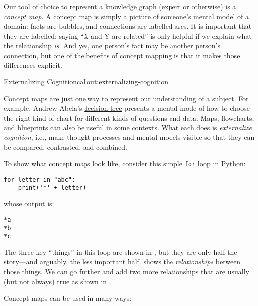 
Our tool of choice to represent a knowledge graph (expert or
otherwise) is a \emph{concept map}.  A concept map is simply a picture
of someone's mental model of a domain: facts are bubbles, and
connections are labelled arcs. It is important that they are labelled:
saying ``X and Y are related'' is only helpful if we explain what the
relationship \emph{is}. And yes, one person's fact may be another
person's connection, but one of the benefits of concept mapping is
that it makes those differences explicit.

\begin{callout}{Externalizing Cognition}{callout:externalizing-cognition}

Concept maps are just one way to represent our understanding of a
subject.  For example, Andrew Abela's
\href{http://extremepresentation.typepad.com/files/choosing-a-good-chart-09.pdf}{decision tree}
presents a mental mode of how to choose the right kind of chart for
different kinds of questions and data.  Maps, flowcharts, and
blueprints can also be useful in some contexts.  What each does
is \emph{externalize cognition}, i.e., make thought processes and
mental models visible so that they can be compared, contrasted, and
combined.

\end{callout}

To show what concept maps look like, consider this simple \texttt{for}
loop in Python:

\begin{verbatim}
for letter in "abc":
    print('*' + letter)
\end{verbatim}

\noindent
whose output is:

\begin{verbatim}
*a
*b
*c
\end{verbatim}

\noindent
The three key ``things'' in this loop are shown in
,  but they are only half the
story---and arguably, the less important half.
 shows the \emph{relationships} between
those things.  We can go further and add two more relationships that are
usually (but not always) true as shown in
.


Concept maps can be used in many ways:

